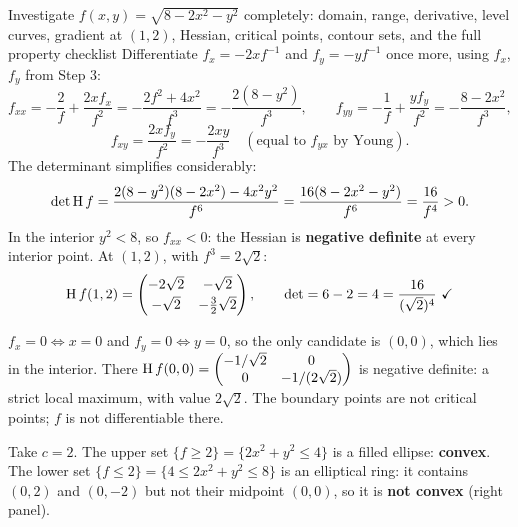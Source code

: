 \begin{worked}{Investigate $f(x,y)=\sqrt{8-2x^{2}-y^{2}}$ completely: domain, range, derivative, level curves, gradient at $(1,2)$, Hessian, critical points, contour sets, and the full property checklist}
Differentiate $f_{x}=-2xf^{-1}$ and $f_{y}=-yf^{-1}$ once more, using
$f_{x}$, $f_{y}$ from Step 3:
\[
  f_{xx}=-\frac{2}{f}+\frac{2x f_{x}}{f^{2}}
        =-\frac{2f^{2}+4x^{2}}{f^{3}}
        =-\frac{2(8-y^{2})}{f^{3}},\qquad
  f_{yy}=-\frac{1}{f}+\frac{y f_{y}}{f^{2}}
        =-\frac{8-2x^{2}}{f^{3}},
\]
\[
  f_{xy}=\frac{2x f_{y}}{f^{2}}=-\frac{2xy}{f^{3}}
  \quad(\text{equal to } f_{yx}\text{ by Young}).
\]
The determinant simplifies considerably:
\[
  \det\operatorname{H} f=\frac{2(8-y^{2})(8-2x^{2})-4x^{2}y^{2}}{f^{6}}
  =\frac{16(8-2x^{2}-y^{2})}{f^{6}}=\frac{16}{f^{4}}>0 .
\]
In the interior $y^{2}<8$, so $f_{xx}<0$: the Hessian is
\textbf{negative definite} at every interior point. At $(1,2)$, with
$f^{3}=2\sqrt2$:
\[
  \Hess f(1,2)=\begin{pmatrix}-2\sqrt2&-\sqrt2\\[2pt]-\sqrt2&-\tfrac32\sqrt2
  \end{pmatrix},\qquad \det=6-2=4=\frac{16}{(\sqrt2)^{4}}\ \checkmark
\]

$f_{x}=0\iff x=0$ and $f_{y}=0\iff y=0$, so the only candidate is
$(0,0)$, which lies in the interior. There
$\operatorname{H} f(0,0)=\begin{pmatrix}-1/\sqrt2&0\\0&-1/(2\sqrt2)\end{pmatrix}$ is
negative definite: a strict local maximum, with value $2\sqrt2$. The
boundary points are not critical points; $f$ is not differentiable there.

Take $c=2$. The upper set $\{f\ge2\}=\{2x^{2}+y^{2}\le4\}$ is a filled
ellipse: \textbf{convex}. The lower set
$\{f\le2\}=\{4\le2x^{2}+y^{2}\le8\}$ is an elliptical ring: it contains
$(0,2)$ and $(0,-2)$ but not their midpoint $(0,0)$, so it is
\textbf{not convex} (right panel).


\end{worked}
